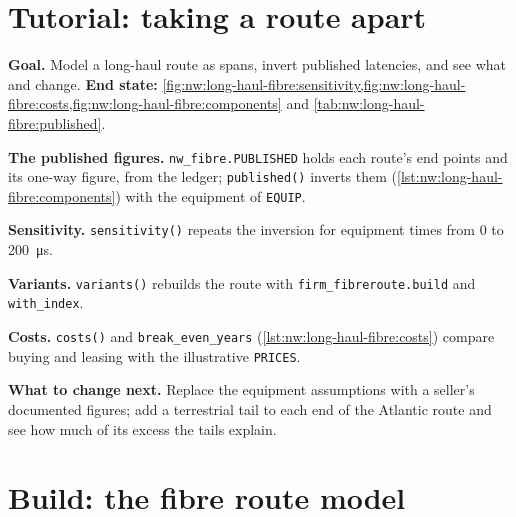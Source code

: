 \section{Tutorial: taking a route apart}\label{tut:nw:long-haul-fibre:tut}

\begin{tutorial}
\textbf{Goal.} Model a long-haul route as spans, invert published latencies, and see what  and  change.
\textbf{End state:} \cref{fig:nw:long-haul-fibre:sensitivity,fig:nw:long-haul-fibre:costs,fig:nw:long-haul-fibre:components} and
\cref{tab:nw:long-haul-fibre:published}.
\begin{tutsteps}
\item \textbf{The published figures.} \texttt{nw\_fibre.PUBLISHED} holds each route's end points and its one-way figure, from the ledger;
  \texttt{published()} inverts them (\cref{lst:nw:long-haul-fibre:components}) with the equipment of \texttt{EQUIP}.
\item \textbf{Sensitivity.} \texttt{sensitivity()} repeats the inversion for equipment times from 0 to \qty{200}{\micro\second}.
\item \textbf{Variants.} \texttt{variants()} rebuilds the route with \texttt{firm\_fibreroute.build} and \texttt{with\_index}.
\item \textbf{Costs.} \texttt{costs()} and \texttt{break\_even\_years} (\cref{lst:nw:long-haul-fibre:costs}) compare buying and leasing with
  the illustrative \texttt{PRICES}.
\end{tutsteps}
\textbf{What to change next.} Replace the equipment assumptions with a seller's documented figures; add a terrestrial tail to each end of the
Atlantic route and see how much of its excess the tails explain.
\end{tutorial}

\section{Build: the fibre route model}\label{bld:nw:long-haul-fibre:fibreroute}

